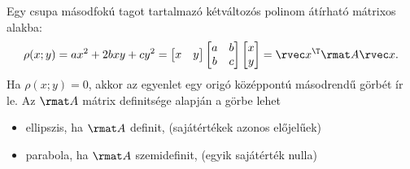\documentclass[a4paper, 12pt]{scrartcl}
\begin{document}
\begin{blueBox}

  Egy csupa másodfokú tagot tartalmazó kétváltozós polinom átírható mátrixos
  alakba:
  $$
    \rho(x;y) = a x^2 + 2b x y + c y^2 = \begin{bmatrix}
      x & y
    \end{bmatrix} \begin{bmatrix}
      a & b \\
      b & c
    \end{bmatrix} \begin{bmatrix}
      x \\
      y
    \end{bmatrix} = \rvec x^\T \rmat A \rvec x
    \text.
  $$
  Ha $\rho(x; y) = 0$, akkor az egyenlet egy origó középpontú másodrendű görbét
  ír le. Az $\rmat A$ mátrix definitsége alapján a görbe lehet
  \begin{itemize}
    \item ellipszis, ha $\rmat A$ definit,
          \hfill (sajátértékek azonos előjelűek)

    \item parabola, ha $\rmat A$ szemidefinit,
          \hfill (egyik sajátérték nulla)


\end{itemize}
\end{blueBox}
\end{document}
